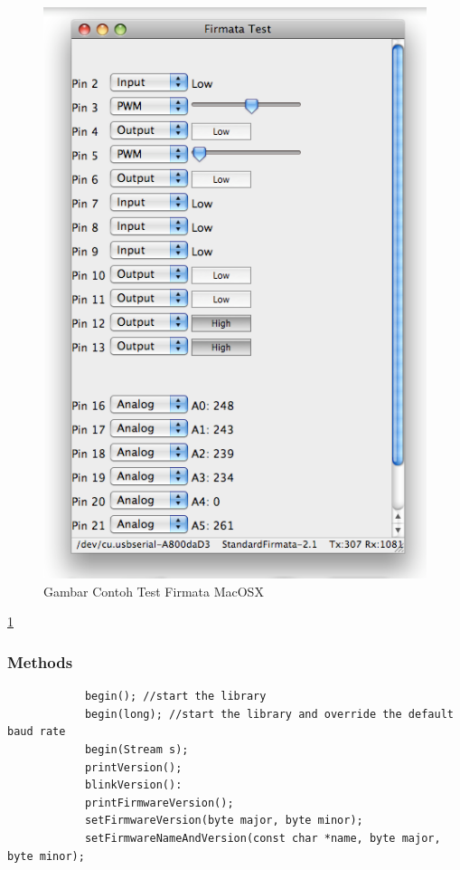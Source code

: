 	\begin{figure} [ht]
		\centerline{\includegraphics[width=1\textwidth]{figures/firmatates.png}}
		\caption{Gambar Contoh Test Firmata MacOSX}
		\label{firmatates}
	\end{figure}
	
	\ref{firmatates}
	
	\subsubsection{Methods}
		\begin{verbatim}
			begin(); //start the library
			begin(long); //start the library and override the default baud rate
			begin(Stream s); 
			printVersion(); 
			blinkVersion(): 
			printFirmwareVersion(); 
			setFirmwareVersion(byte major, byte minor); 
			setFirmwareNameAndVersion(const char *name, byte major, byte minor); 
		\end{verbatim}
		
